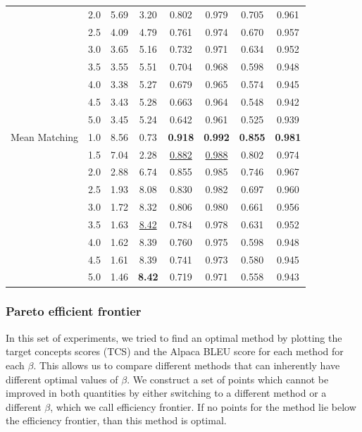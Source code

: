 \begin{table}[htbp]
\begin{tabular}{l|l|cccccc|}
 & 2.0 & 5.69 & 3.20 & 0.802 & 0.979 & 0.705 & 0.961 \\
 & 2.5 & 4.09 & 4.79 & 0.761 & 0.974 & 0.670 & 0.957 \\
 & 3.0 & 3.65 & 5.16 & 0.732 & 0.971 & 0.634 & 0.952 \\
 & 3.5 & 3.55 & 5.51 & 0.704 & 0.968 & 0.598 & 0.948 \\
 & 4.0 & 3.38 & 5.27 & 0.679 & 0.965 & 0.574 & 0.945 \\
 & 4.5 & 3.43 & 5.28 & 0.663 & 0.964 & 0.548 & 0.942 \\
 & 5.0 & 3.45 & 5.24 & 0.642 & 0.961 & 0.525 & 0.939 \\
\hline
Mean Matching & 1.0 & 8.56 & 0.73 & \textbf{0.918} & \textbf{0.992} & \textbf{0.855} & \textbf{0.981} \\
 & 1.5 & 7.04 & 2.28 & \underline{0.882} & \underline{0.988} & 0.802 & 0.974 \\
 & 2.0 & 2.88 & 6.74 & 0.855 & 0.985 & 0.746 & 0.967 \\
 & 2.5 & 1.93 & 8.08 & 0.830 & 0.982 & 0.697 & 0.960 \\
 & 3.0 & 1.72 & 8.32 & 0.806 & 0.980 & 0.661 & 0.956 \\
 & 3.5 & 1.63 & \underline{8.42} & 0.784 & 0.978 & 0.631 & 0.952 \\
 & 4.0 & 1.62 & 8.39 & 0.760 & 0.975 & 0.598 & 0.948 \\
 & 4.5 & 1.61 & 8.39 & 0.741 & 0.973 & 0.580 & 0.945 \\
 & 5.0 & 1.46 & \textbf{8.42} & 0.719 & 0.971 & 0.558 & 0.943 \\
\hline
\end{tabular}
\end{table}

\subsubsection{Pareto efficient frontier}

In this set of experiments, we tried to find an optimal method by plotting the target concepts scores (TCS) and the Alpaca BLEU score for each method for each $\beta$. This allows us to compare different methods that can inherently have different optimal values of $\beta$. We construct a set of points which cannot be improved in both quantities by either switching to a different method or a different $\beta$, which we call efficiency frontier. If no points for the method lie below the efficiency frontier, than this method is optimal.

